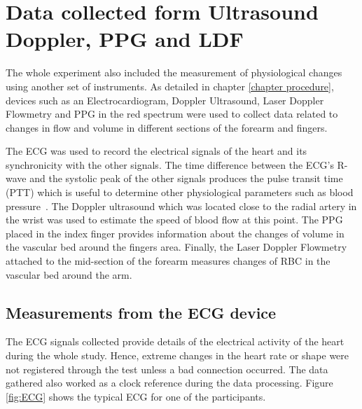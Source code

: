 
\chapter{Data collected form Ultrasound Doppler, PPG and LDF}  %

\ifpdf
\graphicspath{{Chapter9/Figs/Raster/}{Chapter9/Figs/PDF/}{Chapter9/Figs/}}
\else
\graphicspath{{Chapter9/Figs/Vector/}{Chapter9/Figs/}}
\fi

The whole experiment also included the measurement of physiological changes using another set of instruments. As detailed in chapter \ref{chapter procedure}, devices such as an Electrocardiogram, Doppler Ultrasound, Laser Doppler Flowmetry and PPG in the red spectrum were used to collect data related to changes in flow and volume in different sections of the forearm and fingers. 

The ECG was used to record the electrical signals of the heart and its synchronicity with the other signals. The time difference between the ECG's R-wave and the systolic peak of the other signals produces the pulse transit time (PTT) which is useful to determine other physiological parameters such as blood pressure~\cite{liu2017cuffless}. The Doppler ultrasound which was located close to the radial artery in the wrist was used to estimate the speed of blood flow at this point. The PPG placed in the index finger provides information about the changes of volume in the vascular bed around the fingers area. Finally, the Laser Doppler Flowmetry attached to the mid-section of the forearm measures changes of RBC in the vascular bed around the arm. 

\section{Measurements from the ECG device}
\label{section comparison 1}
The ECG signals collected provide details of the electrical activity of the heart during the whole study. Hence, extreme changes in the heart rate or shape were not registered through the test unless a bad connection occurred. The data gathered also worked as a clock reference during the data processing. Figure \ref{fig:ECG} shows the typical ECG for one of the participants.

